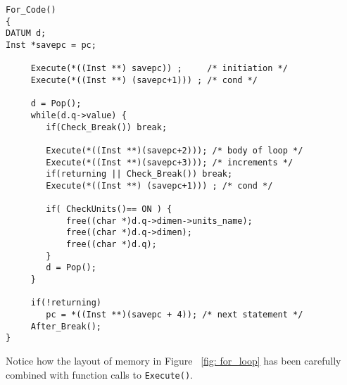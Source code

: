 \begin{footnotesize}
\begin{verbatim}
For_Code()
{
DATUM d;
Inst *savepc = pc;

     Execute(*((Inst **) savepc)) ;     /* initiation */ 
     Execute(*((Inst **) (savepc+1))) ; /* cond */

     d = Pop();
     while(d.q->value) {
        if(Check_Break()) break;

        Execute(*((Inst **)(savepc+2))); /* body of loop */
        Execute(*((Inst **)(savepc+3))); /* increments */
        if(returning || Check_Break()) break;
        Execute(*((Inst **) (savepc+1))) ; /* cond */

        if( CheckUnits()== ON ) {
            free((char *)d.q->dimen->units_name);
            free((char *)d.q->dimen);
            free((char *)d.q);
        }
        d = Pop();
     }

     if(!returning)
        pc = *((Inst **)(savepc + 4)); /* next statement */
     After_Break();
}
\end{verbatim}
\end{footnotesize}

\vspace{0.05 in}\noindent
Notice how the layout of memory in Figure ~\ref{fig: for_loop} has
been carefully combined with function calls to {\tt Execute()}.

